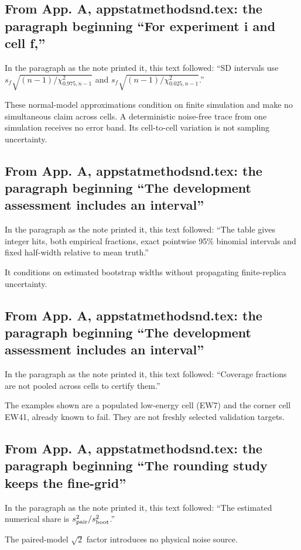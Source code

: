 \subsection{From App. A, appstatmethodsnd.tex: the paragraph beginning ``For experiment i and cell f,''}
In the paragraph as the note printed it, this text followed: ``SD intervals use $s_f\sqrt{(n-1)/\chi^2_{0.975,n-1}}$ and $s_f\sqrt{(n-1)/\chi^2_{0.025,n-1}}$.''\par
These normal-model approximations condition on finite simulation and make no simultaneous claim across cells. A deterministic noise-free trace from one simulation receives no error band. Its cell-to-cell variation is not sampling uncertainty.

\subsection{From App. A, appstatmethodsnd.tex: the paragraph beginning ``The development assessment includes an interval''}
In the paragraph as the note printed it, this text followed: ``The table gives integer hits, both empirical fractions, exact pointwise 95\% binomial intervals and fixed half-width relative to mean truth.''\par
It conditions on estimated bootstrap widths without propagating finite-replica uncertainty.

\subsection{From App. A, appstatmethodsnd.tex: the paragraph beginning ``The development assessment includes an interval''}
In the paragraph as the note printed it, this text followed: ``Coverage fractions are not pooled across cells to certify them.''\par
The examples shown are a populated low-energy cell (EW7) and the corner cell EW41, already known to fail. They are not freshly selected validation targets.

\subsection{From App. A, appstatmethodsnd.tex: the paragraph beginning ``The rounding study keeps the fine-grid''}
In the paragraph as the note printed it, this text followed: ``The estimated numerical share is $s_{\rm pair}^2/s_{\rm boot}^2$.''\par
The paired-model $\sqrt2$ factor introduces no physical noise source.

